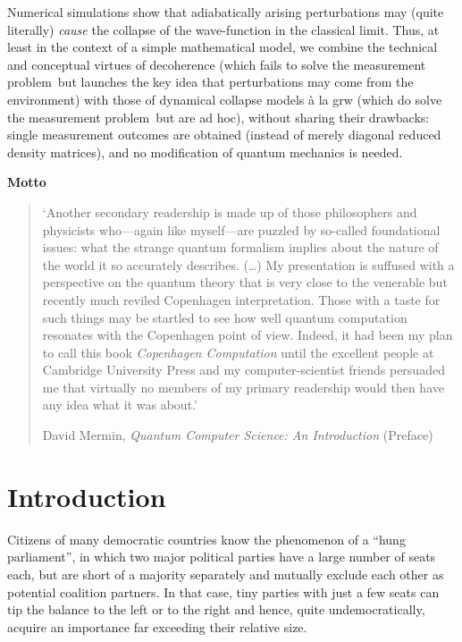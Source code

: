 \documentclass[12pt]{article}
\newcommand{\mmp}{measurement problem}
\begin{document}
Numerical simulations show that adiabatically arising perturbations may  (quite literally) \emph{cause} the collapse of the wave-function in the classical limit. Thus, at least in the context of a simple mathematical model, we combine the technical and conceptual virtues of decoherence (which fails to solve the \mmp\ but launches the key idea that perturbations may come from the environment) with those of
 dynamical collapse models \`{a} la {\sc grw} (which do solve the \mmp\ but are ad hoc), without sharing their drawbacks:   single measurement outcomes are obtained (instead of merely  diagonal reduced density matrices), and
no modification of quantum mechanics is needed.
\newpage
 \begin{small}
 \begin{center} \textbf{Motto}\end{center}
 \begin{quote}
`Another secondary readership is made up of those philosophers and physicists who---again like myself---are puzzled by so-called foundational issues: what the strange quantum formalism implies about the nature of the world it so accurately describes. (\ldots) My presentation is suffused with a perspective on the quantum theory that is very close to the venerable but recently much reviled Copenhagen interpretation. Those with a taste for such things may be startled to see how well quantum computation resonates with the Copenhagen point of view. Indeed, it had been my plan to call this book \emph{Copenhagen Computation} until the excellent people at Cambridge University Press and my computer-scientist friends persuaded  me that virtually no members of my primary readership would then have any idea what it was about.'

\hfill David Mermin,  \emph{Quantum Computer Science: An Introduction} (Preface)
\end{quote}
\end{small}
\newpage
\section{Introduction}
Citizens of many democratic countries know the phenomenon of a ``hung parliament'', in which two major political parties have a large number of seats each, but are short of a majority separately and mutually exclude each other as potential coalition partners. In that case, tiny parties with just a few seats can tip the balance to the left or to the right and hence, quite undemocratically,  acquire an importance far exceeding their relative size. 
\end{document}
